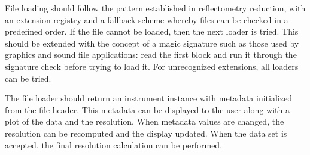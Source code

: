 \documentclass[letterpaper,10pt,english]{sphinxmanual}
\begin{document}
File loading should follow the pattern established in reflectometry
reduction, with an extension registry and a fallback scheme whereby
files can be checked in a predefined order.  If the file cannot be
loaded, then the next loader is tried.  This should be extended with
the concept of a magic signature such as those used by graphics and
sound file applications: read the first block and run it through
the signature check before trying to load it.  For unrecognized
extensions, all loaders can be tried.

The file loader should return an instrument instance with metadata
initialized from the file header.  This metadata can be displayed
to the user along with a plot of the data and the resolution.  When
metadata values are changed, the resolution can be recomputed and the
display updated.  When the data set is accepted, the final resolution
calculation can be performed.
\end{document}
